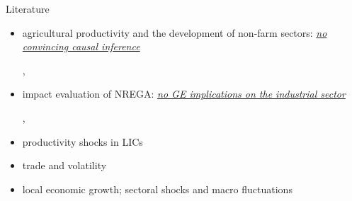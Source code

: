\begin{frame}{Literature}
    \begin{itemize}
        \item<2-> agricultural productivity and the development of non-farm sectors: \textit{\underline{no convincing causal inference}}
        
        {\footnotesize \citet{hornbeck2015does,bustos2016agricultural}, \textcolor<4->{mygreen}{\citet{marden2016agricultural}}}
        \item<3-> impact evaluation of NREGA: \textit{\underline{no GE implications on the industrial sector}}
        
        {\footnotesize \citet{imbert2015labor,berg2012can}, \textcolor<4->{mygreen}{\citet{zimmermann2020guarantee}}}
        \vspace{15pt}
        \item<5-> productivity shocks in LICs
        \item<5-> trade and volatility
        \item<5-> local economic growth; sectoral shocks and macro fluctuations

    \end{itemize}
    
\end{frame}


